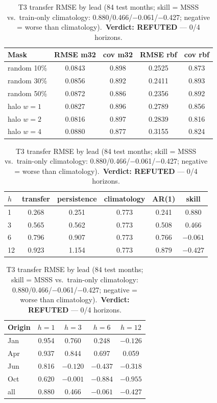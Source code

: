 \documentclass{article}
\begin{document}
\begin{table}[ht]
\centering
\footnotesize
\begin{tabular}{lcccc}
\toprule
Mask & RMSE m32 & cov m32 & RMSE rbf & cov rbf \\
\midrule
random 10\%   & 0.0843 & 0.898 & 0.2525 & 0.873 \\
random 30\%   & 0.0856 & 0.892 & 0.2411 & 0.893 \\
random 50\%   & 0.0872 & 0.886 & 0.2356 & 0.892 \\
halo $w{=}1$  & 0.0827 & 0.896 & 0.2789 & 0.856 \\
halo $w{=}2$  & 0.0816 & 0.897 & 0.2839 & 0.816 \\
halo $w{=}4$  & 0.0880 & 0.877 & 0.3155 & 0.824 \\
\bottomrule
\end{tabular}
\caption{T1a (84 test months): masked-cell RMSE and coverage (target
0.90) per mask; violations in Section~\ref{sec:t1a}, none averaged.}
\label{tab:t1a}
\vspace{1.2ex}
\begin{tabular}{lccccc}
\toprule
$h$ & transfer & persistence & climatology & AR(1) & skill \\
\midrule
1  & 0.268 & 0.251 & 0.773 & 0.241 & 0.880 \\
3  & 0.565 & 0.562 & 0.773 & 0.508 & 0.466 \\
6  & 0.796 & 0.907 & 0.773 & 0.766 & $-0.061$ \\
12 & 0.923 & 1.154 & 0.773 & 0.879 & $-0.427$ \\
\bottomrule
\end{tabular}
\caption{T3 transfer RMSE by lead (84 test months; skill = MSSS vs.\
train-only climatology: 0.880/0.466/$-$0.061/$-$0.427; negative = worse
than climatology).\ \textbf{Verdict: REFUTED} --- 0/4 horizons.}
\label{tab:t3}
\vspace{1.2ex}
\begin{minipage}[t]{0.47\linewidth}
\centering
\begin{tabular}{lcccc}
\toprule
Origin & $h{=}1$ & $h{=}3$ & $h{=}6$ & $h{=}12$ \\
\midrule
Jan & 0.954 & 0.760 & 0.248 & $-0.126$ \\
Apr & 0.937 & 0.844 & 0.697 & 0.059 \\
Jun & 0.816 & $-0.120$ & $-0.437$ & $-0.318$ \\
Oct & 0.620 & $-0.001$ & $-0.884$ & $-0.955$ \\
\midrule
all & 0.880 & 0.466 & $-0.061$ & $-0.427$ \\

\end{tabular}
\end{minipage}
\end{table}
\end{document}

